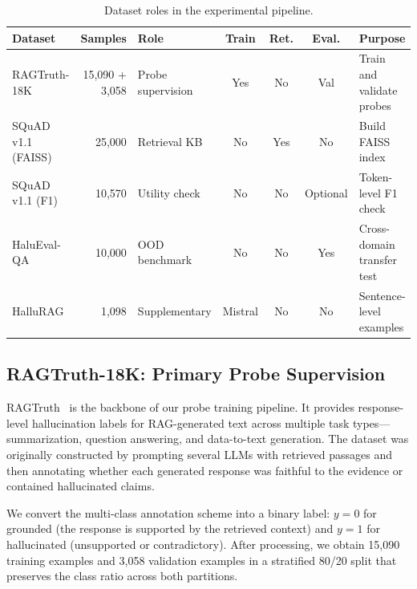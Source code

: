 \begin{table}[!htb]
\centering
\caption{Dataset roles in the experimental pipeline.}
\label{tab:dataset_roles}
\scriptsize
\renewcommand{\arraystretch}{1.25}
\setlength{\tabcolsep}{3pt}

\begin{tabularx}{\textwidth}{@{}L{2.55cm} r L{2.05cm} c c c Y@{}}
\toprule
\textbf{Dataset} & \textbf{Samples} & \textbf{Role} & \textbf{Train} & \textbf{Ret.} & \textbf{Eval.} & \textbf{Purpose} \\
\midrule

RAGTruth-18K 
& 15{,}090 + 3{,}058 
& Probe supervision 
& Yes 
& No 
& Val 
& Train and validate probes \\

SQuAD v1.1 (FAISS) 
& 25{,}000 
& Retrieval KB 
& No 
& Yes 
& No 
& Build FAISS index \\

SQuAD v1.1 (F1) 
& 10{,}570 
& Utility check 
& No 
& No 
& Optional 
& Token-level F1 check \\

HaluEval-QA 
& 10{,}000 
& OOD benchmark 
& No 
& No 
& Yes 
& Cross-domain transfer test \\

HalluRAG 
& 1{,}098 
& Supplementary 
& Mistral 
& No 
& No 
& Sentence-level examples \\

\bottomrule
\end{tabularx}
\end{table}

\subsection{RAGTruth-18K: Primary Probe Supervision}
\label{sec:ragtruth}

RAGTruth~\cite{wu2024ragtruth} is the backbone of our probe training pipeline. It provides response-level hallucination labels for RAG-generated text across multiple task types—summarization, question answering, and data-to-text generation. The dataset was originally constructed by prompting several LLMs with retrieved passages and then annotating whether each generated response was faithful to the evidence or contained hallucinated claims.

We convert the multi-class annotation scheme into a binary label: $y = 0$ for grounded (the response is supported by the retrieved context) and $y = 1$ for hallucinated (unsupported or contradictory). After processing, we obtain 15{,}090 training examples and 3{,}058 validation examples in a stratified 80/20 split that preserves the class ratio across both partitions.

